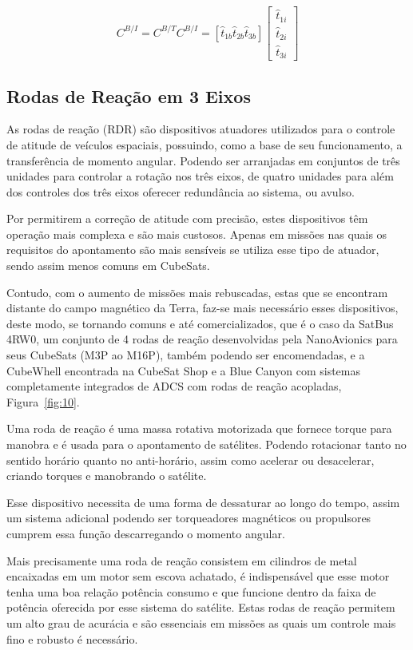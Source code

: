 \begin{equation}
C^{B/I} = C^{B/T}C^{B/I}=\left [\hat{t}_{1b} \hat{t}_{2b} \hat{t}_{3b}  \right ]
\begin{bmatrix} \hat{t}_{1i}\\\hat{t}_{2i}\\\hat{t}_{3i}
\end{bmatrix}
\end{equation}

\subsection{Rodas de Reação em 3 Eixos}\label{sec:3.1.6.1}


As rodas de reação (RDR) são dispositivos atuadores utilizados para o controle de atitude de veículos espaciais, possuindo, como a base de seu funcionamento, a transferência de momento angular. Podendo ser arranjadas em conjuntos de três unidades para controlar a rotação nos três eixos, de quatro unidades para além dos controles dos três eixos oferecer redundância ao sistema, ou avulso.

Por permitirem a correção de atitude com precisão, estes dispositivos têm operação mais complexa e são mais custosos. Apenas em missões nas quais os requisitos do apontamento são mais sensíveis se utiliza esse tipo de atuador, sendo assim menos comuns em CubeSats.

Contudo, com o aumento de missões mais rebuscadas, estas que se encontram distante do campo magnético da Terra, faz-se mais necessário esses dispositivos, deste modo, se tornando comuns e até comercializados, que é o caso da SatBus 4RW0, um conjunto de 4 rodas de reação desenvolvidas pela NanoAvionics para seus CubeSats (M3P ao M16P),  também podendo ser encomendadas, e a CubeWhell encontrada na CubeSat Shop e a Blue Canyon com sistemas completamente integrados de ADCS com rodas de reação acopladas,  Figura~\ref{fig:10}.


Uma roda de reação é uma massa rotativa motorizada que fornece torque para manobra e é usada para o apontamento de satélites. Podendo rotacionar tanto no sentido horário quanto no anti-horário, assim como acelerar ou desacelerar, criando torques e manobrando o satélite.

Esse dispositivo necessita de uma forma de dessaturar ao longo do tempo, assim um sistema adicional podendo ser torqueadores magnéticos ou propulsores cumprem essa função descarregando o momento angular.

Mais precisamente uma roda de reação consistem em cilindros de metal encaixadas em um motor sem escova achatado, é indispensável que esse motor tenha uma boa relação potência consumo e que funcione dentro da faixa de potência oferecida por esse sistema do satélite. Estas rodas de reação permitem um alto grau de acurácia e são essenciais em missões as quais um controle mais fino e robusto é necessário.

